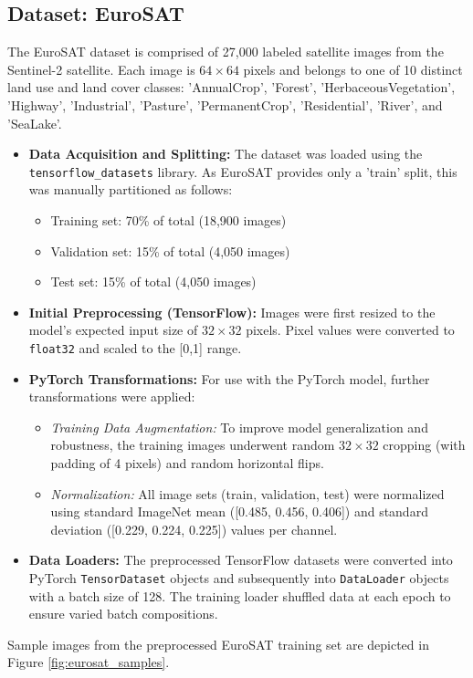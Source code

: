 \documentclass[11pt, a4paper]{article}
\begin{document}
\subsection{Dataset: EuroSAT}
The EuroSAT dataset \cite{EuroSATDB} is comprised of 27,000 labeled satellite images from the Sentinel-2 satellite. Each image is $64 \times 64$ pixels and belongs to one of 10 distinct land use and land cover classes: 'AnnualCrop', 'Forest', 'HerbaceousVegetation', 'Highway', 'Industrial', 'Pasture', 'PermanentCrop', 'Residential', 'River', and 'SeaLake'.
\begin{itemize}[itemsep=0.5em]
    \item \textbf{Data Acquisition and Splitting:} The dataset was loaded using the \texttt{tensorflow\_datasets} library. As EuroSAT provides only a 'train' split, this was manually partitioned as follows:
    \begin{itemize}[itemsep=0.3em]
        \item Training set: 70\% of total (18,900 images)
        \item Validation set: 15\% of total (4,050 images)
        \item Test set: 15\% of total (4,050 images)
    \end{itemize}
    \item \textbf{Initial Preprocessing (TensorFlow):} Images were first resized to the model's expected input size of $32 \times 32$ pixels. Pixel values were converted to \texttt{float32} and scaled to the [0,1] range.
    \item \textbf{PyTorch Transformations:} For use with the PyTorch model, further transformations were applied:
        \begin{itemize}[itemsep=0.3em]
            \item \textit{Training Data Augmentation:} To improve model generalization and robustness, the training images underwent random $32 \times 32$ cropping (with padding of 4 pixels) and random horizontal flips.
            \item \textit{Normalization:} All image sets (train, validation, test) were normalized using standard ImageNet mean ([0.485, 0.456, 0.406]) and standard deviation ([0.229, 0.224, 0.225]) values per channel.
        \end{itemize}
    \item \textbf{Data Loaders:} The preprocessed TensorFlow datasets were converted into PyTorch \texttt{TensorDataset} objects and subsequently into \texttt{DataLoader} objects with a batch size of 128. The training loader shuffled data at each epoch to ensure varied batch compositions.
\end{itemize}
Sample images from the preprocessed EuroSAT training set are depicted in Figure \ref{fig:eurosat_samples}.
\end{document}
